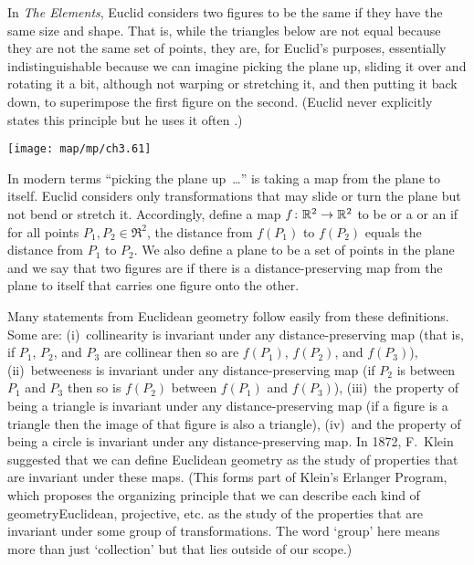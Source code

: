 In \emph{The Elements}, Euclid considers two figures to be
the same if they have the same size and shape.
That is, while the triangles below are not equal because they are not the same 
set of points,
they are, for Euclid's purposes, essentially 
indistinguishable
because we can imagine 
picking the plane up,
sliding it over and rotating it a bit,
although not warping or stretching it,    
and then putting it back down, to superimpose the first figure on
the second.
(Euclid never explicitly states this principle 
but he uses it often \cite{Casey}.)
\begin{center}
  \texttt{[image: map/mp/ch3.61]}
\end{center}
In modern terms ``picking the plane up~\ldots'' 
is taking a
map from the plane to itself. 
Euclid considers only transformations 
that may slide or turn the plane but not bend or stretch it.
Accordingly, define a map $\mbox{$f\colon \mathbb{R}^2\to \mathbb{R}^2$}$ to be 
%
or a  or an
if for all points $P_1,P_2\in\Re^2$,
the distance from $f(P_1)$ to $f(P_2)$ equals the distance from
$P_1$ to $P_2$. 
We also define a plane  
to be a set of points in the plane
and we say that two figures are 
%
 if there is a 
distance-preserving map from the plane to itself that carries one figure 
onto the other.

Many statements from Euclidean geometry 
follow easily from these definitions.
Some are: (i)~collinearity is invariant under any distance-preserving map
(that is, if $P_1$, $P_2$, and $P_3$ are collinear then so are
$f(P_1)$, $f(P_2)$, and $f(P_3)$),
(ii)~betweeness is invariant under any distance-preserving map
(if $P_2$ is between $P_1$ and $P_3$ then so is
$f(P_2)$ between $f(P_1)$ and $f(P_3)$),
(iii)~the property of being a triangle is invariant under 
any distance-preserving map 
(if a figure is a triangle then the image of that figure is also a triangle),
(iv)~and the property of being a circle is invariant under any
distance-preserving map.
In 1872, F.~Klein suggested that we can define 
Euclidean geometry as the study of properties that
are invariant under these maps.
(This forms part of Klein's Erlanger Program, 
which proposes the organizing principle that we can describe each kind of 
geometry\Dash Euclidean, projective, etc.\Dash 
as the study of the properties that are
invariant under some group of transformations.
The word `group' here means more than just `collection' 
but that lies outside of our scope.)

